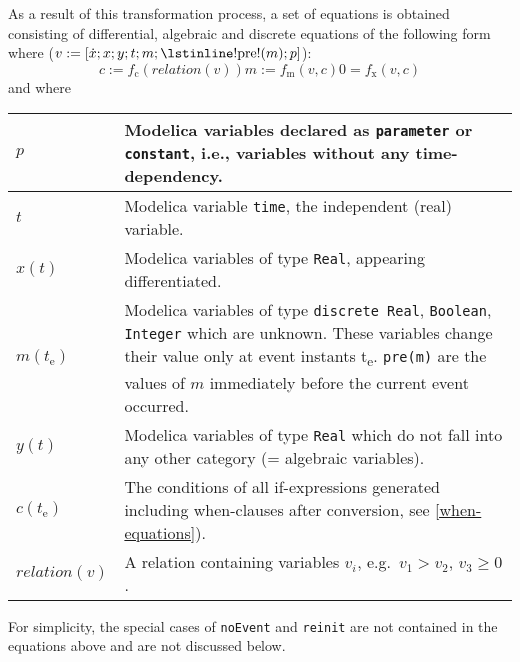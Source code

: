 As a result of this transformation process, a set of equations is
obtained consisting of differential, algebraic and discrete equations of
the following form where ($v := \lbrack \dot{x}; x; y; t; m; \text{\lstinline!pre!}(m); p\rbrack$):
\begin{subequations}
\begin{equation}\label{eq:crossing}
c := f_{\mathrm{c}}(\mathit{relation}(v))
\end{equation}
\begin{equation}
m := f_{\mathrm{m}}(v, c)
\end{equation}
\begin{equation}\label{eq:dae}
0 = f_{\mathrm{x}}(v, c)
\end{equation}
\label{eq:hydrid-dae}
\end{subequations}
and where
\begin{longtable}[]{|p{2cm}|p{12cm}|}
\hline \endhead
$p$ & Modelica variables declared as \lstinline!parameter! or \lstinline!constant!, i.e., variables without any time-dependency.\\
\hline
$t$ & Modelica variable \lstinline!time!, the independent (real) variable.\\
\hline
$x(t)$ & Modelica variables of type \lstinline!Real!, appearing differentiated.\\
\hline
$m(t_{\mathrm{e}})$ & Modelica variables of type \lstinline!discrete Real!, \lstinline!Boolean!, \lstinline!Integer! which are unknown.
These variables change their value only at event instants t\textsubscript{e}. \lstinline!pre(m)! are the values of $m$ immediately before the current event occurred.\\
\hline
$y(t)$ & Modelica variables of type \lstinline!Real! which do not fall into any other category (= algebraic variables).\\
\hline
$c(t_{\mathrm{e}})$ & The conditions of all if-expressions generated including when-clauses after conversion, see \cref{when-equations}).\\
\hline
$\mathit{relation}(v)$ & A relation containing variables $v_{i}$, e.g.\ $v_{1} > v_{2}$, $v_{3} \geq 0$.\\
\hline
\end{longtable}

For simplicity, the special cases of \lstinline!noEvent! and \lstinline!reinit! are not contained in the equations
above and are not discussed below.

